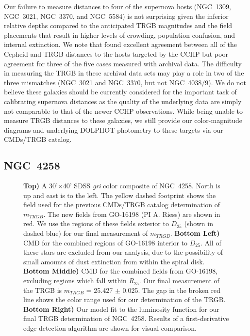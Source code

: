 \documentclass[twocolumn]{aastex62}
\begin{document}
Our failure to measure distances to four of the supernova hosts (NGC~1309, NGC~3021, NGC~3370, and NGC~5584) is not surprising given the inferior relative depths compared to the anticipated TRGB magnitudes and the field placements that result in higher levels of crowding, population confusion, and internal extinction. We note that \cite{2019ApJ...882...34F} found excellent agreement between all of the Cepheid and TRGB distances to the hosts targeted by the CCHP but poor agreement for three of the five cases measured with archival data. The difficulty in measuring the TRGB in these archival data sets may play a role in two of the three mismatches (NGC~3021 and NGC~3370, but not NGC~4038/9).  We do not believe these galaxies should be currently considered for the important task of calibrating supernova distances as the quality of the underlying data are simply not comparable to that of the newer CCHP observations. While being unable to measure TRGB distances to these galaxies, we still provide our color-magnitude diagrams and underlying DOLPHOT photometry to these targets via our CMDs/TRGB catalog.

\subsection{NGC~4258}

\begin{figure*}
\caption{\textbf{Top)} A 30'$\times$40' SDSS \textit{gri} color composite of NGC~4258. North is up and east is to the left. The yellow dashed footprint shows the field used for the previous CMDs/TRGB catalog determination of $m_{TRGB}$. The new fields from GO-16198 (PI A. Riess) are shown in red. We use the regions of these fields exterior to $D_{25}$ (shown in dashed blue) for our final measurement of $m_{TRGB}$. \textbf{Bottom Left)} CMD for the combined regions of GO-16198 interior to $D_{25}$. All of these stars are excluded from our analysis, due to the possibility of small amounts of dust extinction from within the spiral disk. \textbf{Bottom Middle)} CMD for the combined fields from GO-16198, excluding regions which fall within $R_{25}$. Our final measurement of the TRGB is $m_{TRGB}$ = 25.427 $\pm$ 0.025. The gap in the broken red line shows the color range used for our determination of the TRGB. \textbf{Bottom Right)} Our model fit to the luminosity function for our final TRGB determination of NGC~4258. Results of a first-derivative edge detection algorithm are shown for visual comparison.}
\label{NGC4258}
\end{figure*}
\end{document}
